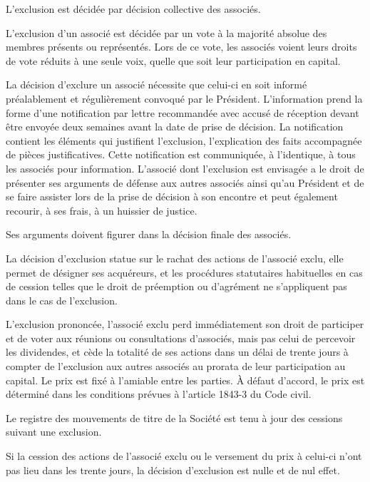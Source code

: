 \documentclass[a4paper,12pt]{report}
\begin{document}
L'exclusion est décidée par décision collective des associés.

L'exclusion d'un associé est décidée par un vote à la majorité absolue des membres présents ou représentés. Lors de ce vote, les associés voient leurs droits de vote réduits à une seule voix, quelle que soit leur participation en capital.

La décision d'exclure un associé nécessite que celui-ci en soit informé préalablement et régulièrement convoqué par le Président. L'information prend la forme d'une notification par lettre recommandée avec accusé de réception devant être envoyée deux semaines avant la date de prise de décision. La notification contient les éléments qui justifient l'exclusion, l'explication des faits accompagnée de pièces justificatives. Cette notification est communiquée, à l'identique, à tous les associés pour information. L'associé dont l'exclusion est envisagée a le droit de présenter ses arguments de défense aux autres associés ainsi qu'au Président et de se faire assister lors de la prise de décision à son encontre et peut également recourir, à ses frais, à un huissier de justice.

Ses arguments doivent figurer dans la décision finale des associés.

La décision d'exclusion statue sur le rachat des actions de l'associé exclu, elle permet de désigner ses acquéreurs, et les procédures statutaires habituelles en cas de cession telles que le droit de préemption ou d'agrément ne s'appliquent pas dans le cas de l'exclusion.

L'exclusion prononcée, l'associé exclu perd immédiatement son droit de participer et de voter aux réunions ou consultations d'associés, mais pas celui de percevoir les dividendes, et cède la totalité de ses actions dans un délai de trente jours à compter de l'exclusion aux autres associés au prorata de leur participation au capital. Le prix est fixé à l'amiable entre les parties. À défaut d'accord, le prix est déterminé dans les conditions prévues à l'article 1843-3 du Code civil.

Le registre des mouvements de titre de la Société est tenu à jour des cessions suivant une exclusion.

Si la cession des actions de l'associé exclu ou le versement du prix à celui-ci n'ont pas lieu dans les trente jours, la décision d'exclusion est nulle et de nul effet.

%
%
%
%
\end{document}
